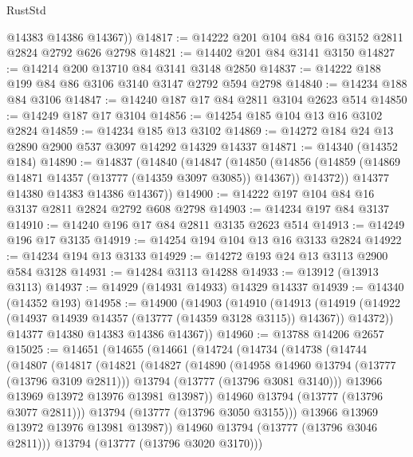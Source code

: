 \begin{lexlean}{RustStd}
\begin{coremodule}
        @14383
        @14386
        @14367))
@14817 := @14222 @201 @104 @84 @16 @3152 @2811 @2824 @2792 @626 @2798
@14821 := @14402 @201 @84 @3141 @3150
@14827 := @14214 @200 @13710 @84 @3141 @3148 @2850
@14837 := @14222 @188 @199 @84 @86 @3106 @3140 @3147 @2792 @594 @2798
@14840 := @14234 @188 @84 @3106
@14847 := @14240 @187 @17 @84 @2811 @3104 @2623 @514
@14850 := @14249 @187 @17 @3104
@14856 := @14254 @185 @104 @13 @16 @3102 @2824
@14859 := @14234 @185 @13 @3102
@14869 := @14272 @184 @24 @13 @2890 @2900 @537 @3097 @14292 @14329 @14337
@14871 := @14340 (@14352 @184)
@14890 := @14837
    (@14840
      (@14847
        (@14850
          (@14856 (@14859 (@14869 @14871 @14357 (@13777 (@14359 @3097 @3085)) @14367)) @14372))
        @14377
        @14380
        @14383
        @14386
        @14367))
@14900 := @14222 @197 @104 @84 @16 @3137 @2811 @2824 @2792 @608 @2798
@14903 := @14234 @197 @84 @3137
@14910 := @14240 @196 @17 @84 @2811 @3135 @2623 @514
@14913 := @14249 @196 @17 @3135
@14919 := @14254 @194 @104 @13 @16 @3133 @2824
@14922 := @14234 @194 @13 @3133
@14929 := @14272 @193 @24 @13 @3113 @2900 @584 @3128
@14931 := @14284 @3113 @14288
@14933 := @13912 (@13913 @3113)
@14937 := @14929 (@14931 @14933) @14329 @14337
@14939 := @14340 (@14352 @193)
@14958 := @14900
    (@14903
      (@14910
        (@14913
          (@14919 (@14922 (@14937 @14939 @14357 (@13777 (@14359 @3128 @3115)) @14367)) @14372))
        @14377
        @14380
        @14383
        @14386
        @14367))
@14960 := @13788 @14206 @2657
@15025 := @14651
    (@14655
      (@14661
        (@14724
          (@14734
            (@14738
              (@14744
                (@14807
                  (@14817
                    (@14821
                      (@14827
                        (@14890
                          (@14958 @14960 @13794 (@13777 (@13796 @3109 @2811)))
                          @13794
                          (@13777 (@13796 @3081 @3140)))
                        @13966
                        @13969
                        @13972
                        @13976
                        @13981
                        @13987))
                    @14960
                    @13794
                    (@13777 (@13796 @3077 @2811)))
                  @13794
                  (@13777 (@13796 @3050 @3155)))
                @13966
                @13969
                @13972
                @13976
                @13981
                @13987))
            @14960
            @13794
            (@13777 (@13796 @3046 @2811)))
          @13794
          (@13777 (@13796 @3020 @3170)))

\end{coremodule}
\end{lexlean}
